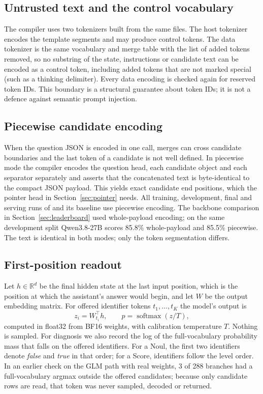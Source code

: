 \subsection{Untrusted text and the control vocabulary}
\label{sec:datatok}

The compiler uses two tokenizers built from the same files. The host tokenizer encodes the
template segments and may produce control tokens. The data tokenizer is the same vocabulary
and merge table with the list of added tokens removed, so no substring of the state,
instructions or candidate text can be encoded as a control token, including added tokens
that are not marked special (such as a thinking delimiter). Every data encoding is checked
again for reserved token IDs. This boundary is a structural guarantee about token IDs; it is
not a defence against semantic prompt injection.

\subsection{Piecewise candidate encoding}
\label{sec:piecewise}

When the question JSON is encoded in one call, merges can cross candidate boundaries and the
last token of a candidate is not well defined. In piecewise mode the compiler encodes the
question head, each candidate object and each separator separately and asserts that the
concatenated text is byte-identical to the compact JSON payload. This yields exact
candidate end positions, which the pointer head in Section~\ref{sec:pointer} needs. All
training, development, final and serving runs of \expone{} and its baseline use piecewise
encoding. The backbone comparison in Section~\ref{sec:leaderboard} used whole-payload
encoding; on the same development split Qwen3.8-27B scores 85.8\% whole-payload and 85.5\%
piecewise. The text is identical in both modes; only the token segmentation differs.

\subsection{First-position readout}
\label{sec:readout}

Let $h\in\mathbb{R}^d$ be the final hidden state at the last input position, which is the
position at which the assistant's answer would begin, and let $W$ be the output embedding
matrix. For offered identifier tokens $t_1,\dots,t_K$ the model's output is
\begin{equation}
  z_i = W_{t_i}^{\top} h, \qquad p = \operatorname{softmax}(z/T),
\end{equation}
computed in float32 from BF16 weights, with calibration temperature $T$. Nothing is sampled.
For diagnosis we also record the log of the full-vocabulary probability mass that falls on
the offered identifiers. For a Noul, the first two identifiers denote \emph{false} and
\emph{true} in that order; for a Score, identifiers follow the level order. In an earlier check on the GLM
path with real weights, 3 of 288 branches had a full-vocabulary argmax outside the offered
candidates; because only candidate rows are read, that token was never sampled, decoded or
returned.


